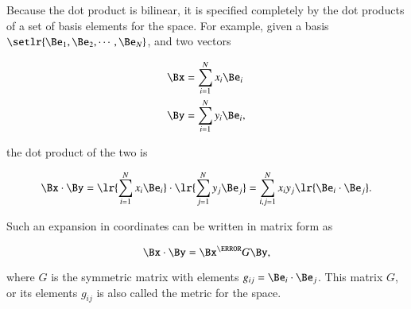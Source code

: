 %
%

Because the dot product is bilinear, it is
specified completely by the dot products of a set of basis elements for the space.
For example,
given a basis \( \setlr{ \Be_1, \Be_2, \cdots, \Be_N} \), and two vectors

\begin{dmath}\label{eqn:prereq_standardbasis:240}
\begin{aligned}
   \Bx &= \sum_{i = 1}^N x_i \Be_i \\
   \By &= \sum_{i = 1}^N y_i \Be_i,
\end{aligned}
\end{dmath}

the dot product of the two is

\begin{dmath}\label{eqn:prereq_standardbasis:260}
\Bx \cdot \By
=
   \lr{ \sum_{i = 1}^N x_i \Be_i } \cdot
   \lr{ \sum_{j = 1}^N y_j \Be_j }
=
   \sum_{i,j = 1}^N x_i y_j \lr{ \Be_i \cdot \Be_j }.
\end{dmath}

Such an expansion in coordinates can be written in matrix form as

\begin{dmath}\label{eqn:prereq_standardbasis:280}
\Bx \cdot \By
=
\Bx^\T G \By,
\end{dmath}

where \( G \) is the symmetric matrix with elements \( g_{ij} = \Be_i \cdot \Be_j \).
This matrix \( G \), or its elements \( g_{ij} \) is also called the metric for the space.


